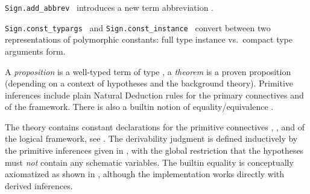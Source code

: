 \begin{isabellebody}
\begin{isamarkuptext}
\begin{description}
  \item \verb|Sign.add_abbrev|~
  introduces a new term abbreviation .

  \item \verb|Sign.const_typargs|~ and \verb|Sign.const_instance|~
  convert between two representations of polymorphic constants: full
  type instance vs.\ compact type arguments form.

  \end{description}%
\end{isamarkuptext}%
\isamarkuptrue%
%
\endisatagmlref
{\isafoldmlref}%
%
\isadelimmlref
%
\endisadelimmlref
%
\isamarkuptrue%
%
\begin{isamarkuptext}%
A \emph{proposition} is a well-typed term of type , a
  \emph{theorem} is a proven proposition (depending on a context of
  hypotheses and the background theory).  Primitive inferences include
  plain Natural Deduction rules for the primary connectives \isa{{\isasymAnd}} and \isa{{\isasymLongrightarrow}} of the framework.  There is also a builtin
  notion of equality/equivalence \isa{{\isasymequiv}}.%
\end{isamarkuptext}%
\isamarkuptrue%
%
\isamarkuptrue%
%
\begin{isamarkuptext}%
The theory  contains constant declarations for the
  primitive connectives \isa{{\isasymAnd}}, \isa{{\isasymLongrightarrow}}, and \isa{{\isasymequiv}} of
  the logical framework, see .  The
  derivability judgment  is
  defined inductively by the primitive inferences given in
  , with the global restriction that the
  hypotheses must \emph{not} contain any schematic variables.  The
  builtin equality is conceptually axiomatized as shown in
  , although the implementation works
  directly with derived inferences.


\end{isamarkuptext}
\end{isabellebody}
